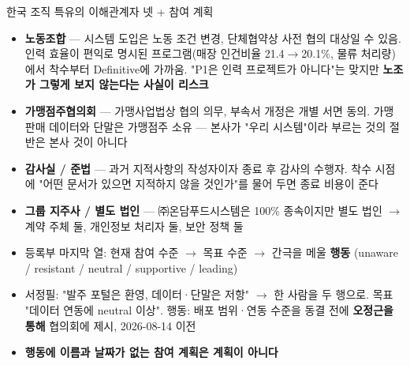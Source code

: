 \begin{frame}[allowframebreaks=1.0]{한국 조직 특유의 이해관계자 넷 + 참여 계획}
\small
\par\smallskip{}\nobreak
\begin{itemize}
\item\relax \textbf{노동조합} — 시스템 도입은 노동 조건 변경, 단체협약상 사전 협의 대상일 수 있음. 인력 효율이 편익로 명시된 프로그램(매장 인건비율 21.4$\rightarrow$20.1\%, 물류 처리량)에서 착수부터 Definitive에 가까움. "P1은 인력 프로젝트가 아니다"는 맞지만 \textbf{노조가 그렇게 보지 않는다는 사실이 리스크}
\item\relax \textbf{가맹점주협의회} — 가맹사업법상 협의 의무, 부속서 개정은 개별 서면 동의. 가맹 판매 데이터와 단말은 가맹점주 소유 — 본사가 "우리 시스템"이라 부르는 것의 절반은 본사 것이 아니다
\item\relax \textbf{감사실 / 준법} — 과거 지적사항의 작성자이자 종료 후 감사의 수행자. 착수 시점에 "어떤 문서가 있으면 지적하지 않을 것인가"를 물어 두면 종료 비용이 준다
\item\relax \textbf{그룹 지주사 / 별도 법인} — ㈜온담푸드시스템은 100\% 종속이지만 별도 법인 $\rightarrow$ 계약 주체 둘, 개인정보 처리자 둘, 보안 정책 둘
\end{itemize}
\par\smallskip{}\nobreak
\begin{itemize}
\item\relax 등록부 마지막 열: 현재 참여 수준 $\rightarrow$ 목표 수준 $\rightarrow$ 간극을 메울 \textbf{행동} (unaware / resistant / neutral / supportive / leading)
\item\relax 서정필: "발주 포털은 환영, 데이터·단말은 저항" $\rightarrow$ 한 사람을 두 행으로. 목표 "데이터 연동에 neutral 이상". 행동: 배포 범위·연동 수준을 동결 전에 \textbf{오정근을 통해} 협의회에 제시, 2026-08-14 이전
\item\relax \textbf{행동에 이름과 날짜가 없는 참여 계획은 계획이 아니다}
\end{itemize}
\end{frame}

